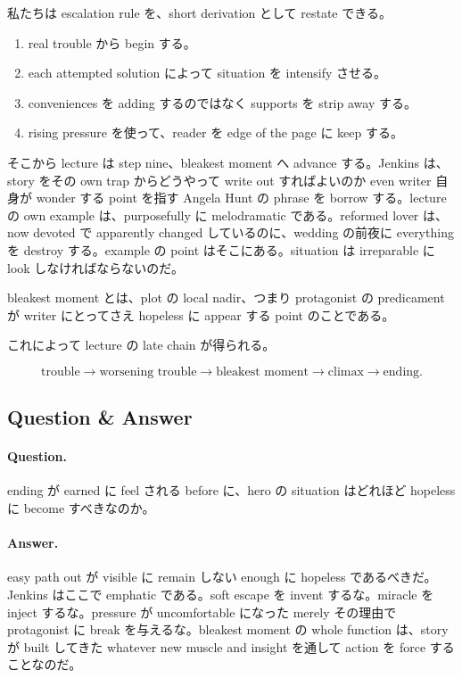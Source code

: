 私たちは escalation rule を、short derivation として restate できる。

\begin{enumerate}
\item real trouble から begin する。
\item each attempted solution によって situation を intensify させる。
\item conveniences を adding するのではなく supports を strip away する。
\item rising pressure を使って、reader を edge of the page に keep する。
\end{enumerate}

そこから lecture は step nine、bleakest moment へ advance する。Jenkins は、story をその own trap からどうやって write out すればよいのか even writer 自身が wonder する point を指す Angela Hunt の phrase を borrow する。lecture の own example は、purposefully に melodramatic である。reformed lover は、now devoted で apparently changed しているのに、wedding の前夜に everything を destroy する。example の point はそこにある。situation は irreparable に look しなければならないのだ。

\begin{definition}
bleakest moment とは、plot の local nadir、つまり protagonist の predicament が writer にとってさえ hopeless に appear する point のことである。
\end{definition}

これによって lecture の late chain が得られる。

\begin{equation}
\text{trouble} \to \text{worsening trouble} \to \text{bleakest moment} \to \text{climax} \to \text{ending}.
\end{equation}

\subsection{Question \& Answer}

\paragraph{Question.} ending が earned に feel される before に、hero の situation はどれほど hopeless に become すべきなのか。

\paragraph{Answer.} easy path out が visible に remain しない enough に hopeless であるべきだ。Jenkins はここで emphatic である。soft escape を invent するな。miracle を inject するな。pressure が uncomfortable になった merely その理由で protagonist に break を与えるな。bleakest moment の whole function は、story が built してきた whatever new muscle and insight を通して action を force することなのだ。

